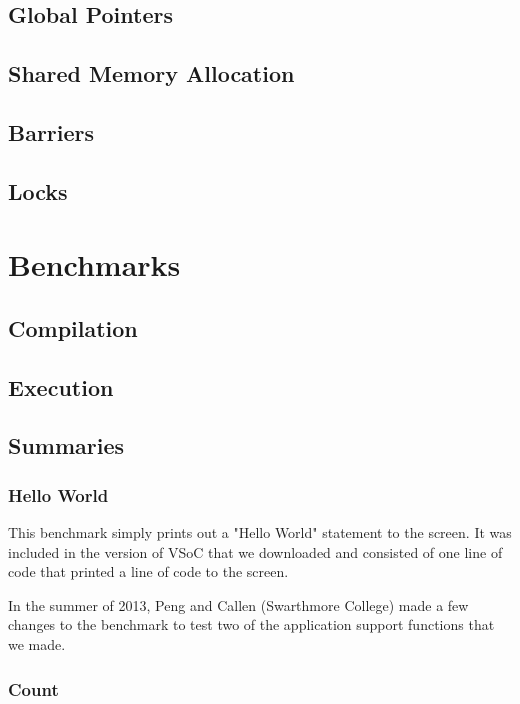 \documentclass{article}
\begin{document}
\subsection{Global Pointers}
\subsection{Shared Memory Allocation}
\subsection{Barriers}
\subsection{Locks}

\newpage
\section{Benchmarks}
\subsection{Compilation}
\subsection{Execution}

\subsection{Summaries}
\subsubsection{Hello World}

This benchmark simply prints out a "Hello World" statement to the screen. It 
was included in the version of VSoC that we downloaded and consisted of one 
line of code that printed a line of code to the screen. 

In the summer of 2013, Peng and Callen (Swarthmore College) made a few changes 
to the benchmark to test two of the application support functions that we made. 

\subsubsection{Count}
\end{document}
